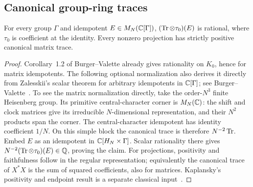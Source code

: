 \subsection{Canonical group-ring traces}
\begin{lemma}\label{lem:rational-group-trace}
For every group $\Gamma$ and idempotent $E\in M_N(\mathbb C[\Gamma])$, $(\operatorname{Tr}\otimes\tau_0)(E)$ is rational, where $\tau_0$ is coefficient at the identity. Every nonzero projection has strictly positive canonical matrix trace.
\end{lemma}
\begin{proof}
Corollary~1.2 of Burger--Valette already gives rationality on $K_0$, hence for matrix idempotents. The following optional normalization also derives it directly from Zalesskii's scalar theorem for arbitrary idempotents in $\mathbb C[\Gamma]$; see Burger--Valette~\cite[Theorem~1.3 and Corollary~1.2]{BV98}. To see the matrix normalization directly, take the order-$N^3$ finite Heisenberg group. Its primitive central-character corner is $M_N(\mathbb C)$: the shift and clock matrices give its irreducible $N$-dimensional representation, and their $N^2$ products span the corner. The central-character idempotent has identity coefficient $1/N$. On this simple block the canonical trace is therefore $N^{-2}\operatorname{Tr}$. Embed $E$ as an idempotent in $\mathbb C[H_N\times\Gamma]$. Scalar rationality there gives $N^{-2}(\operatorname{Tr}\otimes\tau_0)(E)\in\mathbb Q$, proving the claim. For projections, positivity and faithfulness follow in the regular representation; equivalently the canonical trace of $X^*X$ is the sum of squared coefficients, also for matrices. Kaplansky's positivity and endpoint result is a separate classical input~\cite[Theorem~2.1]{BV98}.
\end{proof}

